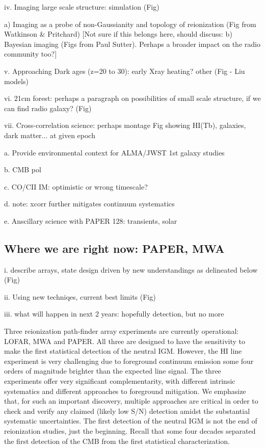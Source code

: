 \documentclass[preprint]{aastex}
\begin{document}
iv. Imaging large scale structure: simulation (Fig) 
    
a) Imaging as a probe of non-Gaussianity and topology of reionization (Fig from Watkinson \& Pritchard)
[Not sure if this belongs here, should discuss: b) Bayesian imaging (Figs from Paul Sutter).  
Perhaps a broader impact on the radio community too?]

v. Approaching Dark ages (z=20 to 30): early Xray heating? other (Fig - Liu models)

vi. 21cm forest: perhaps a paragraph on possibilities of small scale structure, if we can find radio galaxy? (Fig) 

vii. Cross-correlation science: perhaps montage Fig showing HI(Tb), galaxies, dark matter... at given epoch
\cite{lidz11}

a. Provide environmental context for ALMA/JWST 1st galaxy studies

b. CMB pol 

c. CO/CII IM: optimistic or wrong timescale?
  
d. note: xcorr further mitigates continuum systematics

e. Anscillary science with PAPER 128: transients, solar 

\subsection{Where we are right now: PAPER, MWA}  %

i. describe arrays, state design driven by new understandings as delineated below (Fig)

ii. Using new techniqes, current best limits  (Fig)

iii. what will happen in next 2 years: hopefully detection, but no more

Three reionization path-finder array experiments are currently
operational: LOFAR, MWA and PAPER. All three are designed to have the
sensitivity to make the first statistical detection of the neutral
IGM. However, the HI line experiment is very challenging due to
foreground continuum emission some four orders of magnitude brighter
than the expected line signal.  The three experiments offer very
significant complementarity, with different intrinsic systematics and
different approaches to foreground mitigation. We emphasize that, for
such an important discovery, multiple approaches are critical in order
to check and verify any claimed (likely low S/N) detection amidst the
substantial systematic uncertainties. The first detection of
the neutral IGM is not the end of reionization studies, just the 
beginning. Recall that some four decades separated the first detection
of the CMB from the first statistical characterization. 
\end{document}
